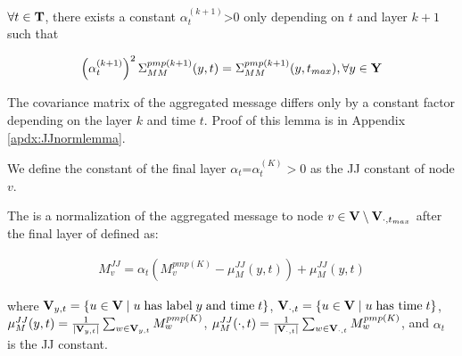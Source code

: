 \begin{lemma}\label{lem:jj}
$\forall t \in \bold{T}$, there exists a constant $\alpha_{t}^{(k+1)}$>$0$ only depending on $t$ and layer $k+1$ such that

\vspace{-20pt}
\begin{align}
    \left(\alpha_{t}^{(k+1)}\right)^2\Sigma^{pmp(k+1)}_{MM}(y,t)=\Sigma^{pmp(k+1)}_{MM}(y,t_{max}), \forall y \in \bold{Y}
\end{align}
\vspace{-15pt}

The covariance matrix of the aggregated message differs only by a constant factor depending on the layer $k$ and time $t$. Proof of this lemma is in Appendix \ref{apdx:JJnormlemma}.

\end{lemma}



\begin{definition}\label{lem:def1}
We define the constant of the final layer $\alpha_{t}$=$\alpha_{t}^{(K)} > 0$ as the JJ constant of node $v$. 

\end{definition}


\begin{definition}\label{lem:def2}
The \JJnorm is a normalization of the aggregated message to node $v \in \bold{V}\setminus\bold{V}_{\cdot,t_{max}}$ after the final layer of \PMP defined as:

\vspace{-20pt}

\begin{align}
M_v^{JJ} = \alpha_{t}\left(M_v^{pmp(K)}-\mu_M^{JJ}(y, t)\right)+\mu_M^{JJ}(y, t)
\end{align}
\vspace{-10pt}

where $\bold{V}_{y,t} = \{u \in \bold{V} \mid u \; \text{has label} \; y \; \text{and time} \; t\}$, $\bold{V}_{\cdot,t} = \{u \in \bold{V} \mid u \; \text{has time} \; t\}$, $\mu_M^{JJ}(y, t)={1\over {\mid \bold{V}_{y,t} \mid}}\sum_{w\in \bold{V}_{y,t}}M_w^{pmp(K)}$, $\mu_M^{JJ}(\cdot, t)={1\over {\mid \bold{V}_{\cdot,t} \mid}}\sum_{w\in \bold{V}_{\cdot,t}}M_w^{pmp(K)}$, and $\alpha_t$ is the JJ constant.

\vspace{-10pt}

\end{definition}

